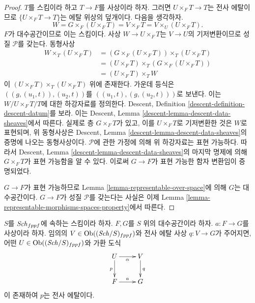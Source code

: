 \begin{proof}
$T$를 스킴이라 하고 $T \to F$를 사상이라 하자. 그러면
$U \times_F T \to T$는 전사 에탈이므로
$\{U \times_F T \to T\}$는 에탈 위상의 덮개이다. 다음을 생각하자.
$$
W = G \times_F (U \times_F T) = V \times_F T = V \times_U (U \times_F T).
$$
$F$가 대수공간이므로 이는 스킴이다. 사상
$W \to U \times_F T$는 $V \to U$의 기저변환이므로 성질
$\mathcal{P}$를 갖는다. 동형사상
\begin{align*}
W \times_T (U \times_F T) & =
(G \times_F (U \times_F T)) \times_T (U \times_F T) \\
& = (U \times_F T) \times_T (G \times_F (U \times_F T)) \\
& = (U \times_F T) \times_T W
\end{align*}
이 $(U \times_F T) \times_T (U \times_F T)$ 위에 존재한다. 가운데
등식은 $((g, (u_1, t)), (u_2, t))$를
$((u_1, t), (g, (u_2, t)))$로 보낸다. 이는
$W/U \times_F T/T$에 대한 하강자료를 정의한다. Descent, Definition
\ref{descent-definition-descent-datum}를 보라. 이는 Descent, Lemma
\ref{descent-lemma-descent-data-sheaves}에서 따른다. 실제로 층
$G \times_F T$가 있고, 이를 $U \times_F T$로 기저변환한 것은
$W$로 표현되며, 위 동형사상은 Descent, Lemma
\ref{descent-lemma-descent-data-sheaves}의 증명에 나오는 동형사상이다.
$\mathcal{P}$에 관한 가정에 의해 위 하강자료는 표현 가능하다.
따라서 Descent, Lemma \ref{descent-lemma-descent-data-sheaves}의
마지막 명제에 의해 $G \times_F T$가 표현 가능함을 알 수 있다.
이로써 $G \to F$가 표현 가능한 함자 변환임이 증명되었다.

\medskip\noindent
$G \to F$가 표현 가능하므로 Lemma
\ref{lemma-representable-over-space}에 의해 $G$는 대수공간이다.
$G \to F$가 성질 $\mathcal{P}$를 갖는다는 사실은 이제 Lemma
\ref{lemma-representable-morphisms-spaces-property}에서 따른다.
\end{proof}

\begin{lemma}
\label{lemma-lift-morphism-presentations}
$S$를 $\mathit{Sch}_{fppf}$에 속하는 스킴이라 하자.
$F, G$를 $S$ 위의 대수공간이라 하자.
$a : F \to G$를 사상이라 하자.
임의의 $V \in \mathop{\mathrm{Ob}}\nolimits((\mathit{Sch}/S)_{fppf})$와 전사 에탈 사상
$q : V \to G$가 주어지면, 어떤
$U \in \mathop{\mathrm{Ob}}\nolimits((\mathit{Sch}/S)_{fppf})$와 가환 도식
$$
\xymatrix{
U \ar[d]_p \ar[r]_\alpha &
V \ar[d]^q \\
F \ar[r]^a & G
}
$$
이 존재하여 $p$는 전사 에탈이다.
\end{lemma}

